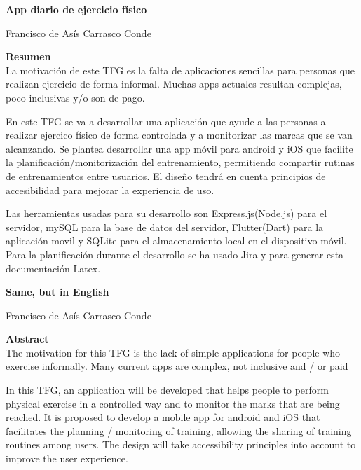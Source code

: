 \thispagestyle{empty}

\begin{center}
{\large\bfseries App diario de ejercicio físico}\\
\end{center}
\begin{center}
Francisco de Asís Carrasco Conde\\
\end{center}

\vspace{0.7cm}

\noindent\textbf{Resumen}\\  
	
La motivación de este TFG es la falta de aplicaciones sencillas para personas que realizan ejercicio de forma informal. Muchas apps actuales resultan complejas, poco inclusivas y/o son de pago.	
	
En este TFG se va a desarrollar una aplicación que ayude a las personas a realizar ejercico físico de forma controlada y a monitorizar las marcas que se van alcanzando. Se plantea desarrollar una app móvil para android y iOS que facilite la planificación/monitorización del entrenamiento, permitiendo compartir rutinas de entrenamientos entre usuarios. El diseño tendrá en cuenta principios de accesibilidad para mejorar la experiencia de uso.

Las herramientas usadas para su desarrollo son Express.js(Node.js) para el servidor, mySQL para la base de datos del servidor, Flutter(Dart) para la aplicación movil y SQLite para el almacenamiento local en el dispositivo móvil. Para la planificación durante el desarrollo se ha usado Jira y para generar esta documentación Latex.

\newpage

\begin{center}
	{\large\bfseries Same, but in English}\\
\end{center}
\begin{center}
	Francisco de Asís Carrasco Conde\\
\end{center}
\vspace{0.7cm}

\noindent\textbf{Abstract}\\
The motivation for this TFG is the lack of simple applications for people who exercise informally. Many current apps are complex, not inclusive and / or paid

In this TFG, an application will be developed that helps people to perform physical exercise in a controlled way and to monitor the marks that are being reached. It is proposed to develop a mobile app for android and iOS that facilitates the planning / monitoring of training, allowing the sharing of training routines among users. The design will take accessibility principles into account to improve the user experience.

